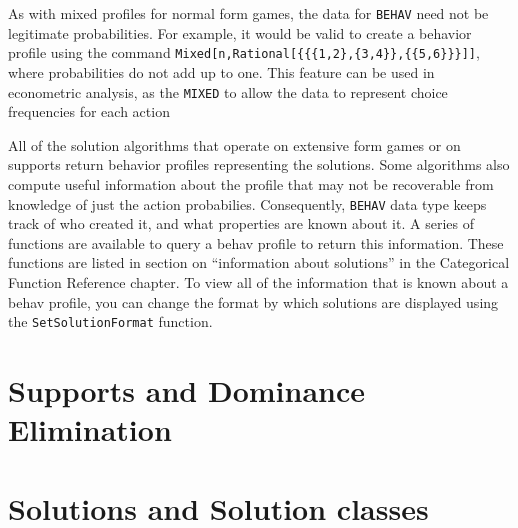 As with mixed profiles for normal form games, the data for
\verb+BEHAV+ need not be legitimate probabilities.  For example, it
would be valid to create a behavior profile using the command
\verb+Mixed[n,Rational[{{{1,2},{3,4}},{{5,6}}}]]+, where probabilities
do not add up to one.  This feature can be used in econometric
analysis, as the \verb+MIXED+ to allow the data to represent choice
frequencies for each action

All of the solution algorithms that operate on extensive form games or on
supports return behavior profiles representing the solutions.  Some
algorithms also compute useful information about the profile that may
not be recoverable from knowledge of just the action probabilies.
Consequently, \verb+BEHAV+ data type keeps track of who created it,
and what properties are known about it.  A series of functions are
available to query a behav profile to return this information.  These
functions are listed in section on ``information about solutions'' in
the Categorical Function Reference chapter.  To view all of the
information that is known about a behav profile, you can change the
format by which solutions are displayed using the
\verb+SetSolutionFormat+ function.  

\section{Supports and Dominance Elimination}


\section{Solutions and Solution classes}


